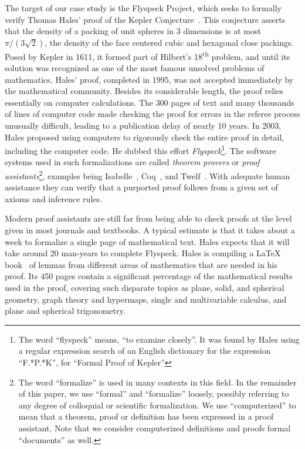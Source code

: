 \begin{background}
The target of our case study is the Flyspeck Project, which seeks to formally
verify Thomas Hales' proof of the Kepler
Conjecture~\cite{Hales:2005:Annals,Hales:2006:DCG}.  This conjecture asserts
that the density of a packing of unit spheres in 3 dimensions is at most
$\pi/(3\sqrt{2})$, the density of the face centered cubic and hexagonal close
packings.  Posed by Kepler in 1611, it formed part of Hilbert's
18\textsuperscript{th} problem, and until its solution was recognized as one of
the most famous unsolved problems of mathematics.  Hales' proof, completed in
1995, was not accepted immediately by the mathematical community.  Besides its
considerable length, the proof relies essentially on computer calculations.  The
300 pages of text and many thousands of lines of computer code made checking the
proof for errors in the referee process unusually difficult, leading to a
publication delay of nearly 10 years.  In 2003, Hales proposed using computers
to rigorously check the entire proof in detail, including the computer code.  He
dubbed this effort \textit{Flyspeck}\footnote{The word ``flyspeck'' means, ``to
  examine closely''.  It was found by Hales using a regular expression search of
  an English dictionary for the expression ``F.*P.*K'', for ``Formal Proof of
  Kepler''}.  The software systems used in such formalizations are called
\textit{theorem provers} or \textit{proof assistants}\footnote{The word
  ``formalize'' is used in many contexts in this field.  In the remainder of
  this paper, we use ``formal'' and ``formalize'' loosely, possibly referring to
  any degree of colloquial or scientific formalization.  We use ``computerized''
  to mean that a theorem, proof or definition has been expressed in a proof
  assistant.  Note that we consider computerized definitions and proofs formal
  ``documents'' as well.}, examples being Isabelle~\cite{Paulson:1994:Isabelle},
Coq~\cite{Bertot:2004:CoqBook}, and Twelf~\cite{Schurmann:1999:Twelf}.  With
adequate human assistance they can verify that a purported proof follows from a
given set of axioms and inference rules.

Modern proof assistants are still far from being able to check proofs at the
level given in most journals and textbooks.  A typical estimate is that it takes
about a week to formalize a single page of mathematical text.  Hales expects
that it will take around 20 man-years to complete Flyspeck.  Hales is compiling
a {\LaTeX} book~\cite{Hales:2008:FlyspeckBook} of lemmas from different areas of
mathematics that are needed in his proof.  Its 450 pages contain a significant
percentage of the mathematical results used in the proof, covering such
disparate topics as plane, solid, and spherical geometry, graph theory and
hypermaps, single and multivariable calculus, and plane and spherical
trigonometry.


\end{background}
